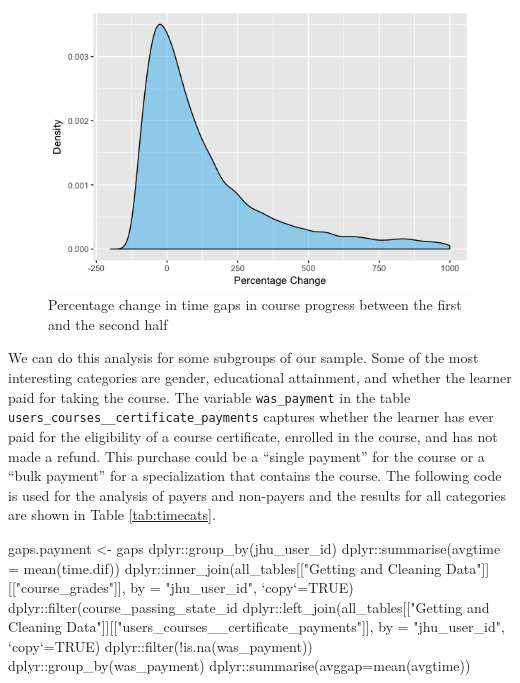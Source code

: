 \begin{figure}[htbp]
    \centering
    \includegraphics[scale=0.5]{timegapchange}
    \caption{Percentage change in time gaps in course progress between the first and the second half}
    \label{figure:timegapchange}
\end{figure}

We can do this analysis for some subgroups of our sample. Some of the
most interesting categories are gender, educational attainment, and
whether the learner paid for taking the course. The variable
\texttt{was\_payment} in the table
\texttt{users\_courses\_\_certificate\_payments} captures whether the
learner has ever paid for the eligibility of a course certificate,
enrolled in the course, and has not made a refund. This purchase could
be a ``single payment'' for the course or a ``bulk payment'' for a
specialization that contains the course. The following code is used for
the analysis of payers and non-payers and the results for all categories
are shown in Table \ref{tab:timecats}.

\begin{Schunk}
\begin{Sinput}
gaps.payment <- gaps %
    dplyr::group_by(jhu_user_id) %
    dplyr::summarise(avgtime = mean(time.dif)) %
    dplyr::inner_join(all_tables[["Getting and Cleaning Data"]][["course_grades"]],
                      by = "jhu_user_id", `copy`=TRUE) %
    dplyr::filter(course_passing_state_id %
    dplyr::left_join(all_tables[["Getting and Cleaning Data"]][["users_courses__certificate_payments"]],
                     by = "jhu_user_id", `copy`=TRUE) %
    dplyr::filter(!is.na(was_payment)) %
    dplyr::group_by(was_payment) %
    dplyr::summarise(avggap=mean(avgtime))
\end{Sinput}
\end{Schunk}

